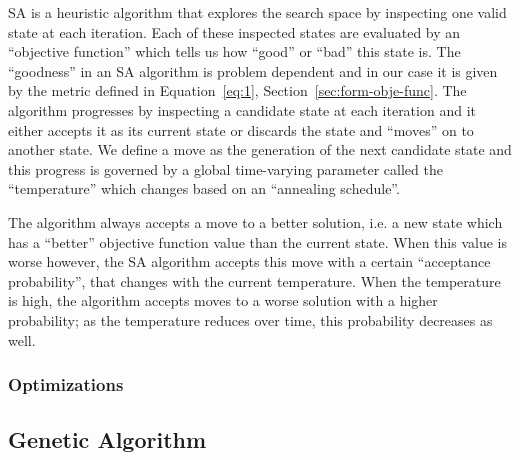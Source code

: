 SA is a heuristic algorithm that explores the search space by inspecting
one valid state at each iteration. Each of these inspected states are evaluated by an ``objective function'' which tells us how ``good'' or ``bad'' this state is. The ``goodness'' in an SA algorithm is problem dependent and in our case it is given by the metric defined in Equation~\ref{eq:1}, Section~\ref{sec:form-obje-func}. The algorithm progresses by inspecting a candidate state at each iteration and it either accepts it as its current state or discards the state and ``moves'' on to another state. We define a move as the generation of the next candidate state and this progress is governed by a global time-varying parameter called the ``temperature'' which changes based on an ``annealing schedule''.

The algorithm always accepts a move to a better solution, i.e. a new state which has a ``better'' objective function value than the current state. When this value is worse however, the SA algorithm accepts this move with a certain ``acceptance probability'', that changes with the current temperature. When the temperature is high, the algorithm accepts moves to a worse solution with a higher probability; as the temperature reduces over time, this probability decreases as well.

\subsubsection{Optimizations}
\label{sec:simu-opti}
 
\subsection{Genetic Algorithm}
\label{sec:gen-algo}

\begin{scriptsize}
\begin{algorithm}[ht!]
\end{algorithm}
\end{scriptsize}

